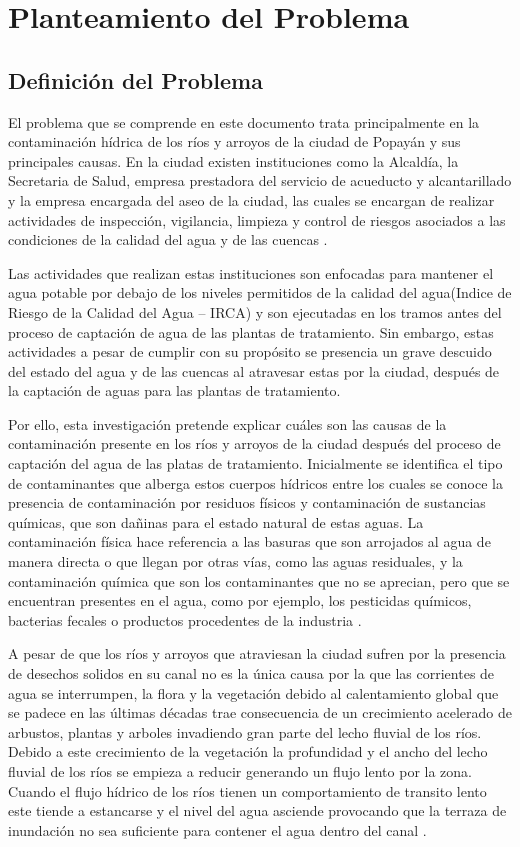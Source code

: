 \section{Planteamiento del Problema}
\subsection{Definición del Problema}
El problema que se comprende en este documento trata principalmente en la contaminación hídrica de los ríos y arroyos de la ciudad de Popayán y sus principales causas. En la ciudad existen instituciones como la Alcaldía, la Secretaria de Salud, empresa prestadora del servicio de acueducto y alcantarillado y la empresa encargada del aseo de la ciudad, las cuales se encargan de realizar actividades de inspección, vigilancia, limpieza y control de riesgos asociados a las condiciones de la calidad del agua y de las cuencas \cite{SecretariadeSalud2019}.

Las actividades que realizan estas instituciones son enfocadas para mantener el agua potable por debajo de los niveles permitidos de la calidad del agua(Indice de Riesgo de la Calidad del Agua -- IRCA) y son ejecutadas en los tramos antes del proceso de captación de agua de las plantas de tratamiento. Sin embargo, estas actividades a pesar de cumplir con su propósito se presencia un grave descuido del estado del agua y de las cuencas al atravesar estas por la ciudad, después de la captación de aguas para las plantas de tratamiento.

Por ello, esta investigación pretende explicar cuáles son las causas de la contaminación presente en los ríos y arroyos de la ciudad después del proceso de captación del agua de las platas de tratamiento. Inicialmente se identifica el tipo de contaminantes que alberga estos cuerpos hídricos entre los cuales se conoce la presencia de contaminación por residuos físicos y contaminación de sustancias químicas, que son dañinas para el estado natural de estas aguas. La contaminación física hace referencia a las basuras que son arrojados al agua de manera directa o que llegan por otras vías, como las aguas residuales, y la contaminación química que son los contaminantes que no se aprecian, pero que se encuentran presentes en el agua, como por ejemplo, los pesticidas químicos, bacterias fecales o productos procedentes de la industria \cite{tipocontaminacion}.

A pesar de que los ríos y arroyos que atraviesan la ciudad sufren por la presencia de desechos solidos en su canal no es la única causa por la que las corrientes de agua se interrumpen, la flora y la vegetación debido al calentamiento global que se padece en las últimas décadas trae consecuencia de un crecimiento acelerado de arbustos, plantas y arboles invadiendo gran parte del lecho fluvial de los ríos. Debido a este crecimiento de la vegetación la profundidad y el ancho del lecho fluvial de los ríos se empieza a reducir generando un flujo lento por la zona. Cuando el flujo hídrico de los ríos tienen un comportamiento de transito lento este tiende a estancarse y el nivel del agua asciende provocando que la terraza de inundación no sea suficiente para contener el agua dentro del canal \cite{Stepien2019}.

